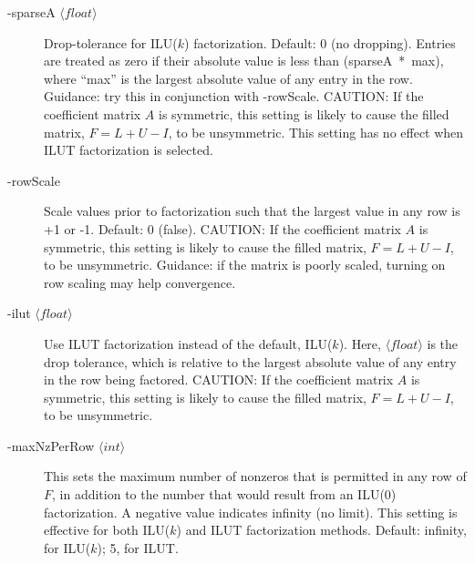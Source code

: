 \begin{description}
\item[-sparseA $\langle float \rangle$] Drop-tolerance for ILU($k$) factorization.
                        Default: 0 (no dropping).
                        Entries are treated as zero if their absolute
                        value is less than \mbox{(sparseA * max)}, where ``max''
                        is the largest absolute value of any entry in the
                        row. Guidance: try this in conjunction with 
                        -rowScale.  CAUTION: If the coefficient matrix $A$ is 
                        symmetric, this
                        setting is likely to cause the filled matrix,
                        $F = L+U-I$, to be unsymmetric.
                        This setting has no effect when ILUT factorization
                        is selected.
\item[-rowScale] Scale values prior to factorization such that the
                 largest value in any row is +1 or -1.
                 Default: 0 (false).
                 CAUTION: If the coefficient matrix $A$ is symmetric, this 
                 setting is likely to cause the filled matrix,
                 $F = L+U-I$, to be unsymmetric.
                 Guidance: if the matrix is poorly scaled, turning on
                 row scaling may help convergence.
\item[-ilut $\langle float \rangle$] Use ILUT factorization instead
                 of the default, ILU($k$).  Here, $\langle float \rangle$
                 is the drop tolerance, which is relative to the largest 
                 absolute value of any entry in the row being factored.
                 CAUTION: If the coefficient matrix $A$ is symmetric, this 
                 setting is likely to cause the filled matrix,
                 $F = L+U-I$, to be unsymmetric.
\item[-maxNzPerRow  $\langle int \rangle$] This sets the maximum number
                 of nonzeros that is permitted in any row of $F$, in
                 addition to the number that would result from an ILU(0)
                 factorization.  A negative value %
                 indicates infinity (no limit).
                 This setting is effective for both ILU($k$)
                 and ILUT factorization methods.
                 Default: infinity, for ILU($k$); 5, for ILUT.
\end{description}

